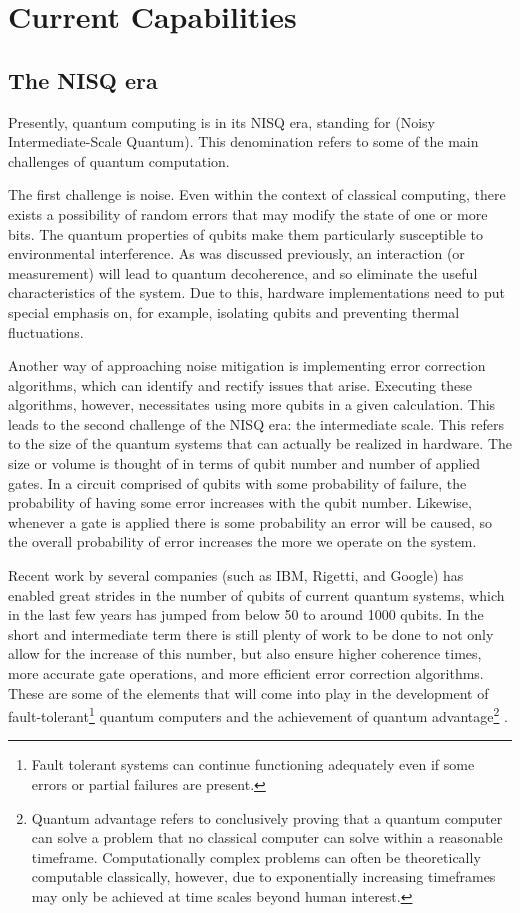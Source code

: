 \section{Current Capabilities}

\subsection{The NISQ era}
Presently, quantum computing is in its NISQ era, standing for (Noisy Intermediate-Scale Quantum). This denomination refers to some of the main challenges of quantum computation. 

The first challenge is noise. Even within the context of classical computing, there exists a possibility of random errors that may modify the state of one or more bits. The quantum properties of qubits make them particularly susceptible to environmental interference. As was discussed previously, an interaction (or measurement) will lead to quantum decoherence, and so eliminate the useful characteristics of the system. Due to this, hardware implementations need to put special emphasis on, for example, isolating qubits and preventing thermal fluctuations. 

Another way of approaching noise mitigation is implementing error correction algorithms, which can identify and rectify issues that arise. Executing these algorithms, however, necessitates using more qubits in a given calculation. This leads to the second challenge of the NISQ era: the intermediate scale. This refers to the size of the quantum systems that can actually be realized in hardware. The size or volume is thought of in terms of qubit number and number of applied gates. In a circuit comprised of qubits with some probability of failure, the probability of having some error increases with the qubit number. Likewise, whenever a gate is applied there is some probability an error will be caused, so the overall probability of error increases the more we operate on the system.

Recent work by several companies (such as IBM, Rigetti, and Google) has enabled great strides in the number of qubits of current quantum systems, which in the last few years has jumped from below 50 to around 1000 qubits. In the short and intermediate term there is still plenty of work to be done to not only allow for the increase of this number, but also ensure higher coherence times, more accurate gate operations, and more efficient error correction algorithms. These are some of the elements that will come into play in the development of fault-tolerant\footnote{Fault tolerant systems can continue functioning adequately even if some errors or partial failures are present.} quantum computers and the achievement of quantum advantage\footnote{Quantum advantage refers to conclusively proving that a quantum computer can solve a problem that no classical computer can solve within a reasonable timeframe. Computationally complex problems can often be theoretically computable classically, however, due to exponentially increasing timeframes may only be achieved at time scales beyond human interest.}
.

